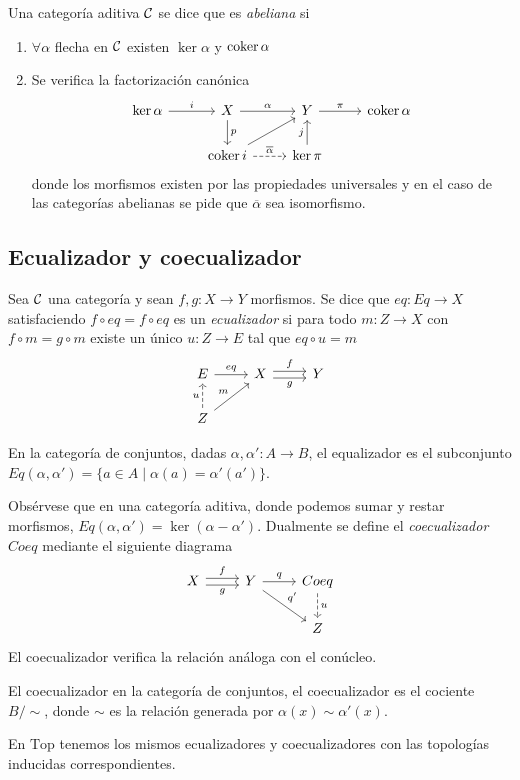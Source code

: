 \documentclass[GA.tex]{subfiles}
\begin{document}
\begin{defi}
Una categoría aditiva $\mathcal{C}$ se dice que es \emph{abeliana} si
\begin{enumerate}
\item $\forall\alpha$ flecha en $\mathcal{C}$ existen $\ker\alpha$ y $\operatorname{coker}\alpha$
\item Se verifica la factorización canónica
\[
\begin{tikzcd}
\ker\alpha\arrow[r, "i"] & X\arrow[r, "\alpha"]\arrow[d, "p"] & Y\arrow[r, "\pi"] & \coker\alpha\\
&     \coker i\arrow[ur] \arrow[r, dashed, "\overline{\alpha}"] & \ker\pi\arrow[u, "j"] &
\end{tikzcd}
\]
donde los morfismos existen por las propiedades universales y en el caso de las categorías abelianas se pide que $\overline{\alpha}$ sea isomorfismo. 
\end{enumerate}

\end{defi}

\subsection{Ecualizador y coecualizador}


Sea $\mathcal{C}$ una categoría y sean $f,g:X\to Y$ morfismos. Se dice que $eq:Eq\to X$ satisfaciendo $f\circ eq= f\circ eq$ es un \emph{ecualizador} si para todo $m:Z\to X$ con $f \circ m=g\circ m$ existe un único $u:Z\to E$ tal que $eq\circ u=m$
\[
\begin{tikzcd}
E\arrow[r, "eq"] & X\arrow[r, shift left, "f"]\arrow[r, shift right, "g"'] & Y\\
Z\arrow[u, dashed, "u"]\arrow[ur, "m"] & 
\end{tikzcd}
\] 

\begin{ej}
En la categoría de conjuntos, dadas $\alpha, \alpha': A\to B$, el equalizador es el subconjunto $Eq(\alpha,\alpha')=\{a\in A\mid \alpha(a)=\alpha'(a')\}$. 
\end{ej}
Obsérvese que en una categoría aditiva, donde podemos sumar y restar morfismos, $Eq(\alpha,\alpha')=\ker(\alpha-\alpha')$. Dualmente se define el \emph{coecualizador} $Coeq$ mediante el siguiente diagrama
\[
\begin{tikzcd}
X\arrow[r, shift left, "f"]\arrow[r, shift right, "g"'] & Y\arrow[r, "q"] \arrow[dr, "q'"]& Coeq\arrow[d,dashed, "u"]\\
& & Z
\end{tikzcd}
\]
El coecualizador verifica la relación análoga con el conúcleo.
\begin{ej}
El coecualizador en la categoría de conjuntos, el coecualizador es el cociente $B/\sim$, donde $\sim$ es la relación generada por $\alpha(x)\sim\alpha'(x)$. 
\end{ej}
\begin{ej}
En $\mathrm{Top}$ tenemos los mismos ecualizadores y coecualizadores con las topologías inducidas correspondientes. 
\end{ej}
\end{document}
